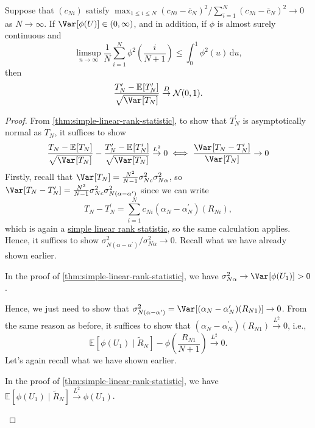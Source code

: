 \begin{theorem}\label{thm:simple-linear-rank-statistic-2}
	Suppose that \((c_{Ni})\) satisfy \(\max _{1 \leq i \leq N} (c_{Ni} - \overline{c} _N)^2 / \sum_{i=1}^{N} (c_{Ni} - \overline{c} _N)^2 \to 0\) as \(N \to \infty \). If \(\Var_{}[\phi (U)] \in (0, \infty )\), and in addition, if \(\phi \) is almost surely continuous and
	\[
		\limsup_{n \to \infty} \frac{1}{N} \sum_{i=1}^{N} \phi ^2\left( \frac{i}{N+1} \right)
		\leq \int_{0}^{1} \phi ^2(u) \,\mathrm{d}u,
	\]
	then
	\[
		\frac{T_N^{\prime} - \mathbb{E}_{}[T_N^{\prime} ] }{\sqrt{\Var_{}[T_N] } }
		\overset{D}{\to} \mathcal{N} (0, 1).
	\]
\end{theorem}
\begin{proof}
	From \autoref{thm:simple-linear-rank-statistic}, to show that \(T_N^{\prime} \) is asymptotically normal as \(T_N\), it suffices to show
	\[
		\frac{T_N - \mathbb{E}_{}[T_N] }{\sqrt{\Var_{}[T_N] } } - \frac{T_N^{\prime} - \mathbb{E}_{}[T_N^{\prime} ] }{\sqrt{\Var_{}[T_N] } }
		\overset{L^2}{\to} 0
		\iff \frac{\Var_{}[T_N - T_N^{\prime} ] }{\Var_{}[T_N]}
		\to 0
	\]
	Firstly, recall that \(\Var_{}[T_N] = \frac{N^2}{N-1} \sigma _{Nc}^2 \sigma _{N \alpha }^2\), so \(\Var_{}[T_N - T_N^{\prime} ] = \frac{N^2}{N-1} \sigma _{Nc}^2 \sigma _{N(\alpha - \alpha ^{\prime} )}^2\) since we can write
	\[
		T_N - T_N^{\prime}
		= \sum_{i=1}^{N} c_{Ni} (\alpha _N - \alpha _N^{\prime} )(R_{Ni}),
	\]
	which is again a \hyperref[def:simple-linrea-rank-statistic]{simple linear rank statistic}, so the same calculation applies. Hence, it suffices to show \(\sigma _{N(\alpha - \alpha ^{\prime} )}^2 / \sigma _{N \alpha }^2 \to 0\). Recall what we have already shown earlier.

	\begin{prev}
		In the proof of \autoref{thm:simple-linear-rank-statistic}, we have \(\sigma _{N \alpha }^2 \to \Var_{}[\phi (U_1)] > 0\).
	\end{prev}

	Hence, we just need to show that \(\sigma _{N(\alpha - \alpha ^{\prime} )}^2 = \Var_{}[(\alpha _N - \alpha _N^{\prime} )(R_{N1})] \to 0\). From the same reason as before, it suffices to show that \((\alpha _N - \alpha _N^{\prime} )(R_{N1}) \overset{L^2}{\to} 0\), i.e.,
	\[
		\mathbb{E}_{}[\phi (U_1) \mid \widetilde{R} _N] - \phi \left( \frac{R_{N1}}{N+1} \right)
		\overset{L^2}{\to} 0.
	\]
	Let's again recall what we have shown earlier.

	\begin{prev}
		In the proof of \autoref{thm:simple-linear-rank-statistic}, we have \(\mathbb{E}_{}[\phi (U_1) \mid \widetilde{R} _N] \overset{L^2}{\to} \phi (U_1)\).
	\end{prev}


\end{proof}
